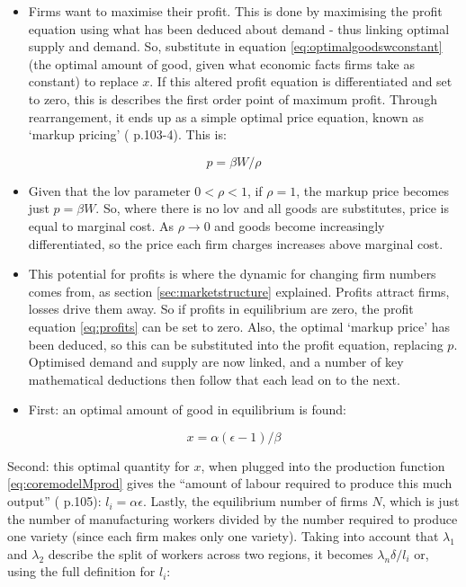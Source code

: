 {\begin{itemize}
\item Firms want to maximise their profit. This is done by maximising the profit equation using what has been deduced about demand - thus linking optimal supply and demand. So, substitute in equation \eqref{eq:optimalgoodswconstant} (the optimal amount of good, given what economic facts firms take as constant) to replace $x$. If this altered profit equation is differentiated and set to zero, this is describes the first order point of maximum profit. Through rearrangement, it ends up as a simple optimal price equation, known as `markup pricing' (\citealt{brakman_new_2009} p.103-4). This is: 
\end{itemize}

\begin{equation}
p = \beta W / \rho\label{eq:markupprice} 
\end{equation}

\begin{itemize}
\item Given that the \gls{lov} parameter $0 < \rho < 1$, if $\rho=1$, the markup price becomes just $p=\beta W$. So, where there is no \gls{lov} and all goods are substitutes, price is equal to marginal cost. As $\rho \rightarrow 0$ and goods become increasingly differentiated, so the price each firm charges increases above marginal cost.
\item This potential for profits is where the dynamic for changing firm numbers comes from, as section \ref{sec:marketstructure} explained. Profits attract firms, losses drive them away. So if profits in equilibrium are zero, the profit equation \eqref{eq:profits} can be set to zero. Also, the optimal `markup price' has been deduced, so this can be substituted into the profit equation, replacing $p$. Optimised demand and supply are now linked, and a number of key mathematical deductions then follow that each lead on to the next.
\item First: an optimal amount of good in equilibrium is found: 
\end{itemize}

\begin{equation}
x=\alpha(\epsilon - 1)/\beta\label{eq:optgood}
\end{equation}

\begin{itemize}
Second: this optimal quantity for $x$, when plugged into the production function \eqref{eq:coremodelMprod} gives the ``amount of labour required to produce this much output'' (\citealt{brakman_new_2009} p.105): $l_{i} = \alpha \epsilon$. Lastly, the equilibrium number of firms $N$, which is just the number of manufacturing workers divided by the number required to produce one variety (since each firm makes only one variety). Taking into account that $\lambda_{1}$ and $\lambda_{2}$ describe the split of workers across two regions, it becomes $\lambda_{n} \delta / l_{i}$ or, using the full definition for $l_{i}$:


\end{itemize}}

